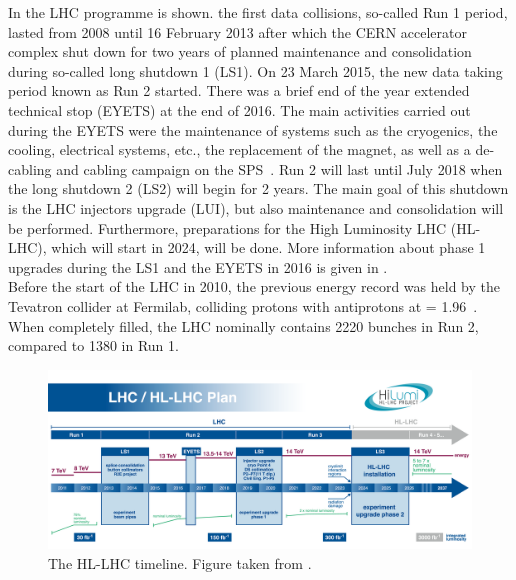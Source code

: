 In  the LHC programme is shown. the first data collisions, so-called Run 1 period, lasted from 2008 until 16 February 2013 after which  the CERN accelerator complex shut down for two years of planned maintenance and consolidation during so-called long shutdown 1 (LS1). On 23 March 2015, the new data taking period known as Run 2 started. There was a brief end of the year extended technical stop (EYETS) at the end of 2016. The main activities carried out during the EYETS were the maintenance of systems such as the cryogenics, the cooling, electrical systems, etc., the replacement of the magnet, as well as a de-cabling and cabling campaign on the SPS~\cite{MurilloQuijada:2017agx}. Run 2 will last until July 2018 when the  long shutdown 2 (LS2) will begin for 2 years. The main goal of this shutdown is the LHC injectors upgrade (LUI), but also maintenance and consolidation will be performed. Furthermore, preparations for the High Luminosity LHC (HL-LHC), which will start in 2024, will be done. More information about phase 1 upgrades during the LS1 and the EYETS in 2016 is given in .\\ %
 Before the start of the LHC in 2010, the previous energy record was held by the Tevatron collider at Fermilab, colliding protons with antiprotons at \com = 1.96~\TeV.  When completely filled, the LHC nominally contains 2220 bunches in Run 2, compared to 1380 in Run 1. %
\begin{figure}[htbp]
	\centering
	\includegraphics[width=1.\linewidth]{2_ExperimentalSetup/Figures/lhc_schedule}
	\caption{The HL-LHC timeline. Figure taken from \cite{Antonella:1975962}.}
	\label{fig:lhcschedule}
\end{figure}


